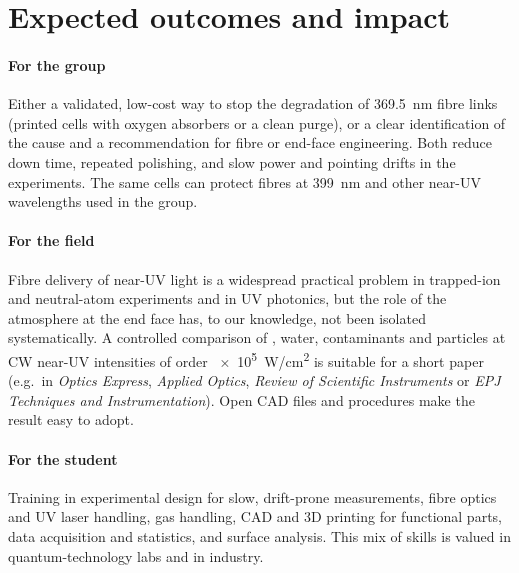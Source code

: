 \section{Expected outcomes and impact}\label{sec:outcomes}

\paragraph{For the group} Either a validated, low-cost way to stop the degradation of \SI{369.5}{nm}
fibre links (printed cells with oxygen absorbers or a clean purge), or a clear identification of the
cause and a recommendation for fibre or end-face engineering. Both reduce down time, repeated polishing,
and slow power and pointing drifts in the experiments. The same cells can protect fibres at
\SI{399}{nm} and other near-UV wavelengths used in the group.

\paragraph{For the field} Fibre delivery of near-UV light is a widespread practical problem in
trapped-ion and neutral-atom experiments and in UV photonics, but the role of the atmosphere at the end
face has, to our knowledge, not been isolated systematically. A controlled comparison of \Oxy, water,
contaminants and particles at CW near-UV intensities of order \SI{e5}{W/cm^2} is suitable for a short paper
(e.g.\ in \emph{Optics Express}, \emph{Applied Optics}, \emph{Review of Scientific Instruments} or
\emph{EPJ Techniques and Instrumentation}). Open CAD files and procedures make the result easy to adopt.

\paragraph{For the student} Training in experimental design for slow, drift-prone measurements, fibre
optics and UV laser handling, gas handling, CAD and 3D printing for functional parts, data acquisition
and statistics, and surface analysis. This mix of skills is valued in quantum-technology labs and in
industry.
